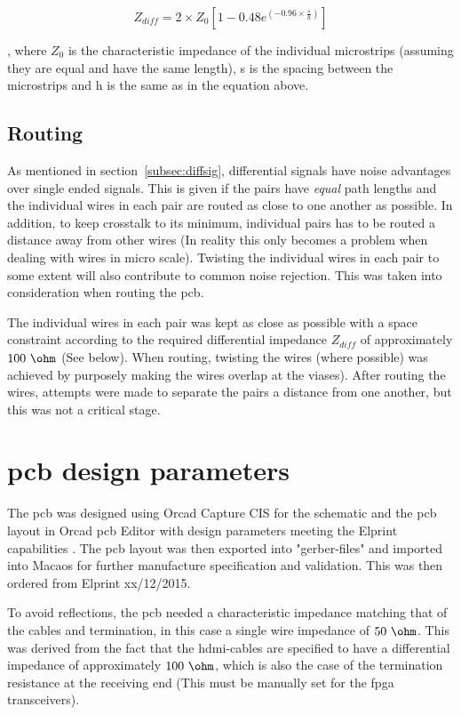 \documentclass[main.tex]{subfiles}
\begin{document}
\begin{equation}
    Z_{diff} = 2 \times Z_0 [1 - 0.48 e^{(-0.96 \times \frac{s}{h})}]
\end{equation}

, where $Z_0$ is the characteristic impedance of the individual microstrips (assuming they are equal and have the same length), s is the spacing between the microstrips and h is the same as in the equation above.
\cite{douglas98}

\subsection{Routing}

As mentioned in section~\ref{subsec:diffsig}, differential signals have noise advantages over single ended signals. This is given if the pairs have \textit{equal} path lengths and the individual wires in each pair are routed as close to one another as possible. In addition, to keep crosstalk to its minimum, individual pairs has to be routed a distance away from other wires (In reality this only becomes a problem when dealing with wires in micro scale). Twisting the individual wires in each pair to some extent will also contribute to common noise rejection.\cite{weste11} 
This was taken into consideration when routing the \gls{pcb}. 

The individual wires in each pair was kept as close as possible with a space constraint according to the required differential impedance $Z_{diff}$ of approximately $100\ \ohm$ (See below). When routing, twisting the wires (where possible) was achieved by purposely making the wires overlap at the viases). After routing the wires, attempts were made to separate the pairs a distance from one another, but this was not a critical stage.

\section{\gls{pcb} design parameters}

The \gls{pcb} was designed using Orcad Capture CIS for the schematic and the \gls{pcb} layout in Orcad \gls{pcb} Editor with design parameters meeting the Elprint capabilities \cite{elprint15}. The \gls{pcb} layout was then exported into "gerber-files" and imported into Macaos for further manufacture specification and validation. This was then ordered from Elprint xx/12/2015.

To avoid reflections, the \gls{pcb} needed a characteristic impedance matching that of the cables and termination, in this case a single wire impedance of $50\ \ohm$. This was derived from the fact that the \gls{hdmi}-cables are specified to have a differential impedance of approximately $100\ \ohm$, which is also the case of the termination resistance at the receiving end (This must be manually set for the \gls{fpga} transceivers).
\end{document}

